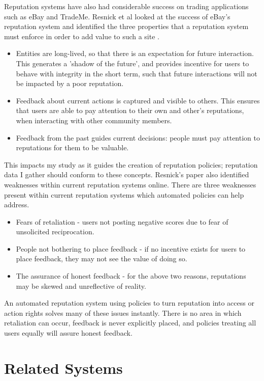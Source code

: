 Reputation systems have also had considerable success on trading applications such as eBay and TradeMe. Resnick et al looked at the success of eBay's reputation system and identified the three properties that a reputation system must enforce in order to add value to such a site \cite{resnick2000reputation,resnick2002trust}. 

\begin{itemize}
 \item Entities are long-lived, so that there is an expectation for future interaction. This generates a 'shadow of the future', and provides incentive for users to behave with integrity in the short term, such that future interactions will not be impacted by a poor reputation. 
 \item Feedback about current actions is captured and visible to others. This ensures that users are able to pay attention to their own and other's reputations, when interacting with other community members. 
 \item Feedback from the past guides current decisions: people must pay attention to reputations for them to be valuable. 
\end{itemize}

This impacts my study as it guides the creation of reputation policies; reputation data I gather should conform to these concepts. Resnick's paper also identified weaknesses within current reputation systems online. There are three weaknesses present within current reputation systems which automated policies can help address. 

\begin{itemize}
 \item Fears of retaliation - users not posting negative scores due to fear of unsolicited reciprocation.
 \item People not bothering to place feedback - if no incentive exists for users to place feedback, they may not see the value of doing so.
 \item The assurance of honest feedback - for the above two reasons, reputations may be skewed and unreflective of reality.
\end{itemize}

An automated reputation system using policies to turn reputation into access or action rights solves many of these issues instantly. There is no area in which retaliation can occur, feedback is never explicitly placed, and policies treating all users equally will assure honest feedback.

\section{Related Systems}

